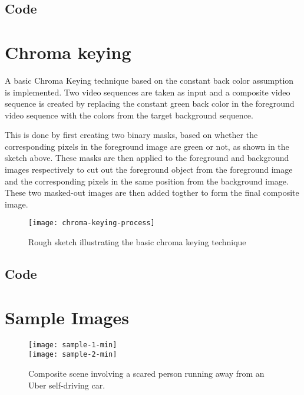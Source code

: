\documentclass[a4paper,11pt]{article}
\begin{document}
  \subsection{Code}
  
 
 \vspace{2em}
 \section{Chroma keying}
  A basic Chroma Keying technique based on the constant back color assumption is implemented. Two video sequences are taken as input and a composite video sequence is created by replacing the constant green back color in the foreground video sequence with the colors from the target background sequence. 
  
  This is done by first creating two binary masks, based on whether the corresponding pixels in the foreground image are green or not, as shown in the sketch above. These masks are then applied to the foreground and background images respectively to cut out the foreground object from the foreground image and the corresponding pixels in the same position from the background image. These two masked-out images are then added togther to form the final composite image.
  
  \begin{figure}
  \begin{center}
   \texttt{[image: chroma-keying-process]}
   \caption{Rough sketch illustrating the basic chroma keying technique}
  \end{center}
  \end{figure}

  \subsection{Code}
  
  \vspace{2em}
  
  \section{Sample Images}
  \begin{figure}[H]
    \centering
   \texttt{[image: sample-1-min]}\\
   \vspace{2em}
   \texttt{[image: sample-2-min]}
   \caption{Composite scene involving a scared person running away from an Uber self-driving car.}
  \end{figure}
  
\end{document}
